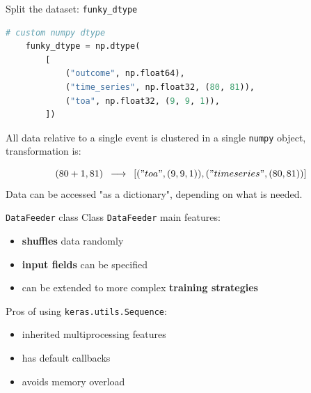 \documentclass{beamer}
\begin{document}
\begin{frame}[fragile]{Split the dataset: \texttt{funky\_dtype}}

    
    \begin{lstlisting}[language=Python]
    # custom numpy dtype
    funky_dtype = np.dtype(
        [
            ("outcome", np.float64),
            ("time_series", np.float32, (80, 81)),
            ("toa", np.float32, (9, 9, 1)),
        ])
    \end{lstlisting}
    
    All data relative to a single event is clustered in a single \texttt{numpy} object, transformation is:
    
    \begin{equation*}
        (80 + 1, 81)\,\,\, \longrightarrow \,\,\, [("toa", (9, 9, 1)), ("timeseries", (80, 81))]
    \end{equation*}
    Data can be accessed "as a dictionary", depending on what is needed.

\end{frame}


\begin{frame}{\texttt{DataFeeder} class}
    Class \texttt{DataFeeder} main features:
    \vfill
    \begin{itemize}
        \item[\textbullet] \textbf{shuffles} data randomly
        \item[\textbullet] \textbf{input fields} can be specified 
        \item[\textbullet] can be extended to more complex \textbf{training strategies}
    \end{itemize}
    

    \vfill

    Pros of using \texttt{keras.utils.Sequence}:
    \vfill
    \begin{itemize}
        \item[\textbullet] inherited multiprocessing features
        \item[\textbullet] has default callbacks
        \item[\textbullet] avoids memory overload
    \end{itemize}
    
\end{frame}
\end{document}
